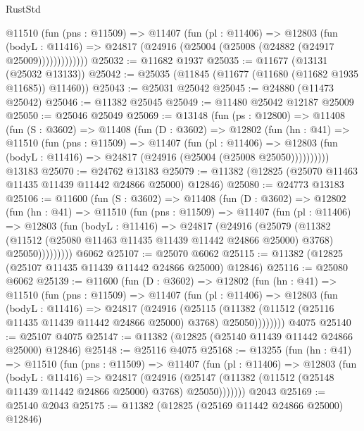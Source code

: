 \begin{lexlean}{RustStd}
\begin{coremodule}
            @11510
              (fun (pns : @11509) =>
              @11407
                (fun (pl : @11406) =>
                @12803
                  (fun (bodyL : @11416) =>
                  @24817 (@24916 (@25004 (@25008 (@24882 (@24917 @25009)))))))))))))
@25032 := @11682 @1937
@25035 := @11677 (@13131 (@25032 @13133))
@25042 := @25035 (@11845 (@11677 (@11680 (@11682 @1935 @11685)) @11460))
@25043 := @25031 @25042
@25045 := @24880 (@11473 @25042)
@25046 := @11382 @25045
@25049 := @11480 @25042 @12187 @25009
@25050 := @25046 @25049
@25069 := @13148
    (fun (ps : @12800) =>
    @11408
      (fun (S : @3602) =>
      @11408
        (fun (D : @3602) =>
        @12802
          (fun (hn : @41) =>
          @11510
            (fun (pns : @11509) =>
            @11407
              (fun (pl : @11406) =>
              @12803 (fun (bodyL : @11416) => @24817 (@24916 (@25004 (@25008 @25050))))))))))
    @13183
@25070 := @24762 @13183
@25079 := @11382 (@12825 (@25070 @11463 @11435 @11439 @11442 @24866 @25000) @12846)
@25080 := @24773 @13183
@25106 := @11600
    (fun (S : @3602) =>
    @11408
      (fun (D : @3602) =>
      @12802
        (fun (hn : @41) =>
        @11510
          (fun (pns : @11509) =>
          @11407
            (fun (pl : @11406) =>
            @12803
              (fun (bodyL : @11416) =>
              @24817
                (@24916
                  (@25079
                    (@11382
                      (@11512 (@25080 @11463 @11435 @11439 @11442 @24866 @25000) @3768)
                      @25050)))))))))
    @6062
@25107 := @25070 @6062
@25115 := @11382 (@12825 (@25107 @11435 @11439 @11442 @24866 @25000) @12846)
@25116 := @25080 @6062
@25139 := @11600
    (fun (D : @3602) =>
    @12802
      (fun (hn : @41) =>
      @11510
        (fun (pns : @11509) =>
        @11407
          (fun (pl : @11406) =>
          @12803
            (fun (bodyL : @11416) =>
            @24817
              (@24916
                (@25115
                  (@11382 (@11512 (@25116 @11435 @11439 @11442 @24866 @25000) @3768) @25050))))))))
    @4075
@25140 := @25107 @4075
@25147 := @11382 (@12825 (@25140 @11439 @11442 @24866 @25000) @12846)
@25148 := @25116 @4075
@25168 := @13255
    (fun (hn : @41) =>
    @11510
      (fun (pns : @11509) =>
      @11407
        (fun (pl : @11406) =>
        @12803
          (fun (bodyL : @11416) =>
          @24817
            (@24916
              (@25147 (@11382 (@11512 (@25148 @11439 @11442 @24866 @25000) @3768) @25050)))))))
    @2043
@25169 := @25140 @2043
@25175 := @11382 (@12825 (@25169 @11442 @24866 @25000) @12846)

\end{coremodule}
\end{lexlean}
